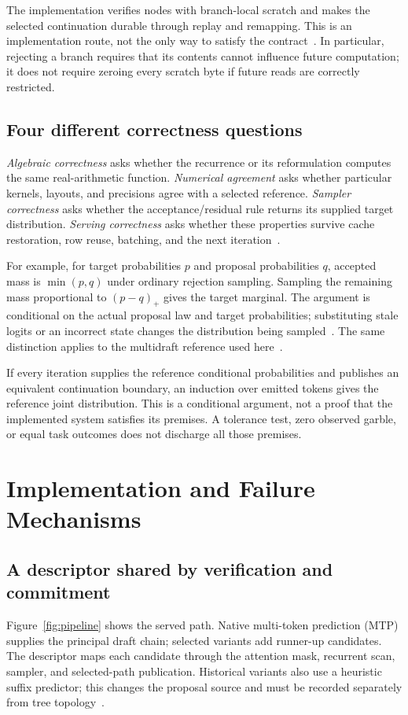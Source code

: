 \documentclass[conference]{IEEEtran}
\begin{document}
The implementation verifies nodes with branch-local scratch and makes the selected continuation durable through replay and remapping. This is an implementation route, not the only way to satisfy the contract~\cite{lumo2026receipts,lumo2026stateless}. In particular, rejecting a branch requires that its contents cannot influence future computation; it does not require zeroing every scratch byte if future reads are correctly restricted.

\subsection{Four different correctness questions}
\textit{Algebraic correctness} asks whether the recurrence or its reformulation computes the same real-arithmetic function. \textit{Numerical agreement} asks whether particular kernels, layouts, and precisions agree with a selected reference. \textit{Sampler correctness} asks whether the acceptance/residual rule returns its supplied target distribution. \textit{Serving correctness} asks whether these properties survive cache restoration, row reuse, batching, and the next iteration~\cite{yang2024delta,chen2023sampling,lumo2026archive}.

For example, for target probabilities $p$ and proposal probabilities $q$, accepted mass is $\min(p,q)$ under ordinary rejection sampling. Sampling the remaining mass proportional to $(p-q)_+$ gives the target marginal. The argument is conditional on the actual proposal law and target probabilities; substituting stale logits or an incorrect state changes the distribution being sampled~\cite{leviathan2023fast,chen2023sampling}. The same distinction applies to the multidraft reference used here~\cite{miao2023specinfer,lumo2026receipts}.

If every iteration supplies the reference conditional probabilities and publishes an equivalent continuation boundary, an induction over emitted tokens gives the reference joint distribution. This is a conditional argument, not a proof that the implemented system satisfies its premises. A tolerance test, zero observed garble, or equal task outcomes does not discharge all those premises.

\section{Implementation and Failure Mechanisms}
\subsection{A descriptor shared by verification and commitment}
Figure~\ref{fig:pipeline} shows the served path. Native multi-token prediction (MTP) supplies the principal draft chain; selected variants add runner-up candidates. The descriptor maps each candidate through the attention mask, recurrent scan, sampler, and selected-path publication. Historical variants also use a heuristic suffix predictor; this changes the proposal source and must be recorded separately from tree topology~\cite{lumo2026receipts,lumo2026cost}.
\end{document}
